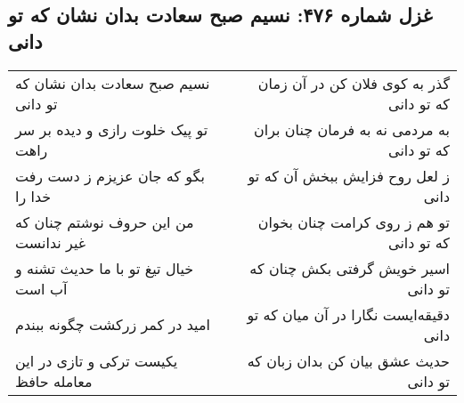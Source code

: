 \begin{center}
\section*{غزل شماره ۴۷۶: نسیم صبح سعادت بدان نشان که تو دانی}
\label{sec:sh476}
\begin{longtable}{l p{0.5cm} r}
نسیم صبح سعادت بدان نشان که تو دانی
&&
گذر به کوی فلان کن در آن زمان که تو دانی
\\
تو پیک خلوت رازی و دیده بر سر راهت
&&
به مردمی نه به فرمان چنان بران که تو دانی
\\
بگو که جان عزیزم ز دست رفت خدا را
&&
ز لعل روح فزایش ببخش آن که تو دانی
\\
من این حروف نوشتم چنان که غیر ندانست
&&
تو هم ز روی کرامت چنان بخوان که تو دانی
\\
خیال تیغ تو با ما حدیث تشنه و آب است
&&
اسیر خویش گرفتی بکش چنان که تو دانی
\\
امید در کمر زرکشت چگونه ببندم
&&
دقیقه‌ایست نگارا در آن میان که تو دانی
\\
یکیست ترکی و تازی در این معامله حافظ
&&
حدیث عشق بیان کن بدان زبان که تو دانی
\\
\end{longtable}
\end{center}

